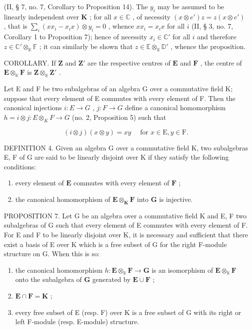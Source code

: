 (II, § 7, no. 7, Corollary to Proposition 14). The \(y_{i}\) may be assumed to be linearly independent over \(\mathbf{K}\) ; for all \(x \in \mathbb{C}\) , of necessity \((x \otimes e')z = z(x \otimes e')\) , that is \(\sum_{i} (xx_{i} - x_{i}x) \otimes y_{i} = 0\) , whence \(xx_{i} = x_{i}x\) for all \(i\) (II, § 3, no. 7, Corollary 1 to Proposition 7); hence of necessity \(x_{i} \in \mathbb{C}'\) for all \(i\) and therefore \(z \in \mathbb{C}' \otimes_{\mathbb{K}} \mathbb{F}\) ; it can similarly be shown that \(z \in \mathbb{E} \otimes_{\mathbb{K}} \mathbb{D}'\) , whence the proposition.

COROLLARY. If \(\mathbf{Z}\) and \(\mathbf{Z}'\) are the respective centres of \(\mathbf{E}\) and \(\mathbf{F}\) , the centre of \(\mathbf{E} \otimes_{\mathbb{K}} \mathbf{F}\) is \(\mathbf{Z} \otimes_{\mathbb{K}} \mathbf{Z}'\) .

Let E and F be two subalgebras of an algebra G over a commutative field K; suppose that every element of E commutes with every element of F. Then the canonical injections \(i: E \to G\) , \(j: F \to G\) define a canonical homomorphism \(h = i \otimes j: E \otimes_{K} F \to G\) (no. 2, Proposition 5) such that

\[
(i \otimes j) (x \otimes y) = x y \quad \text { for } x \in \mathrm{E}, y \in \mathrm{F}.
\]

DEFINITION 4. Given an algebra G over a commutative field K, two subalgebras E, F of G are said to be linearly disjoint over K if they satisfy the following conditions:

\begin{enumerate}
\def\labelenumi{(\arabic{enumi})}
\item
  every element of \(\mathbf{E}\) commutes with every element of \(\mathbf{F}\) ;
\item
  the canonical homomorphism of \(\mathbf{E} \otimes_{\mathbf{K}} \mathbf{F}\) into \(\mathbf{G}\) is injective.
\end{enumerate}

PROPOSITION 7. Let G be an algebra over a commutative field K and E, F two subalgebras of G such that every element of E commutes with every element of F. For E and F to be linearly disjoint over K, it is necessary and sufficient that there exist a basis of E over K which is a free subset of G for the right F-module structure on G. When this is so:

\begin{enumerate}
\def\labelenumi{(\roman{enumi})}
\item
  the canonical homomorphism \(h: \mathbf{E} \otimes_{\mathbb{K}} \mathbf{F} \to \mathbf{G}\) is an isomorphism of \(\mathbf{E} \otimes_{\mathbb{K}} \mathbf{F}\) onto the subalgebra of \(\mathbf{G}\) generated by \(\mathbf{E} \cup \mathbf{F}\) ;
\item
  \(\mathbf{E} \cap \mathbf{F} = \mathbf{K}\) ;
\item
  every free subset of E (resp. F) over K is a free subset of G with its right or left F-module (resp. E-module) structure.
\end{enumerate}

